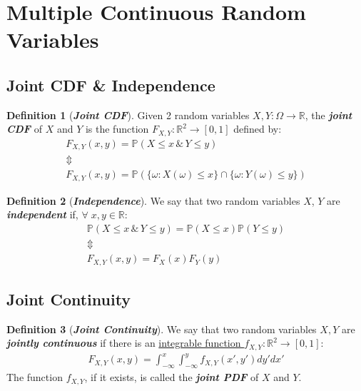 \documentclass[12pt]{extarticle}
\newcommand{\term}[1]{\textbf{\textit{#1}}}
\theoremstyle{definition}
\newtheorem*{definition}{Definition}
\theoremstyle{remark}
\newcommand{\prob}[1]{\mathbb{P}\left(#1\right)}
\begin{document}
\pagebreak
\section{Multiple Continuous Random Variables}
\subsection{Joint CDF \& Independence}
\begin{tcolorbox}[colback=blue!50!green!15!white]
    \begin{definition}[\term{Joint CDF}]
        Given 2 random variables $X,Y:\Omega\to\mathbb{R}$, the 
\term{joint CDF} of $X$ and $Y$ is the function 
\ul{$F_{X,Y}:\mathbb{R}^2\to[0,1]$} defined by: \begin{gather*}
            F_{X,Y}(x,y)=\prob{X\leq x\,\&\,Y\leq y} \\
            \Updownarrow \\
            F_{X,Y}(x,y)=\prob{\{\omega:X(\omega)\leq 
x\}\cap\{\omega:Y(\omega)\leq y\}}
        \end{gather*}
    \end{definition}
\end{tcolorbox}

\begin{tcolorbox}[colback=red!60!yellow!15!white]
    \begin{definition}[\term{Independence}]
        We say that two random variables $X$, $Y$ are \term{independent} 
if, $\forall\; x,y\in\mathbb{R}$: \begin{gather*}
            \prob{X\leq x\,\&\,Y\leq y}=\prob{X\leq x}\prob{Y\leq y}\\
            \Updownarrow\\
            F_{X,Y}(x,y)=F_X(x)F_Y(y)
        \end{gather*}
    \end{definition}
\end{tcolorbox}

\subsection{Joint Continuity}
\begin{tcolorbox}[colback=red!50!blue!10!white]
    \begin{definition}[\term{Joint Continuity}]
        We say that two random variables $X,Y$ are \term{jointly 
continuous} if there is an \ul{integrable function 
$f_{X,Y}:\mathbb{R}^2\to[0,1]$}: \begin{align*}            
F_{X,Y}(x,y)=\int_{-\infty}^x\int_{-\infty}^yf_{X,Y}(x',y')dy'dx'
        \end{align*}
        The function $f_{X,Y}$, if it exists, is called the \term{joint 
PDF} of $X$ and $Y$.
    \end{definition}
\end{tcolorbox}
\end{document}

